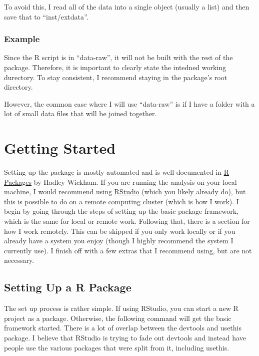 \documentclass[]{book}
\begin{document}
To avoid this, I read all of the data into a single object (usually a list) and then save that to ``inst/extdata''.

\hypertarget{example}{%
\subsection{Example}\label{example}}

Since the R script is in ``data-raw'', it will not be built with the rest of the package. Therefore, it is important to clearly state the intedned working durectory. To stay consistent, I recommend staying in the package's root directory.

However, the common case where I will use ``data-raw'' is if I have a folder with a lot of small data files that will be joined together.

\hypertarget{getting-started}{%
\chapter{Getting Started}\label{getting-started}}

Setting up the package is mostly automated and is well documented in \href{https://r-pkgs.org/index.html}{R Packages} by Hadley Wickham. If you are running the analysis on your local machine, I would recommend using \href{https://www.rstudio.com}{RStudio} (which you likely already do), but this is possible to do on a remote computing cluster (which is how I work). I begin by going through the steps of setting up the basic package framework, which is the same for local or remote work. Following that, there is a section for how I work remotely. This can be skipped if you only work locally or if you already have a system you enjoy (though I highly recommend the system I currently use). I finish off with a few extras that I recommend using, but are not necessary.

\hypertarget{setting-up-a-r-package}{%
\section{Setting Up a R Package}\label{setting-up-a-r-package}}

The set up process is rather simple. If using RStudio, you can start a new R project as a package. Otherwise, the following command will get the basic framework started. There is a lot of overlap between the devtools and usethis package. I believe that RStudio is trying to fade out devtools and instead have people use the various packages that were split from it, including usethis.
\end{document}
